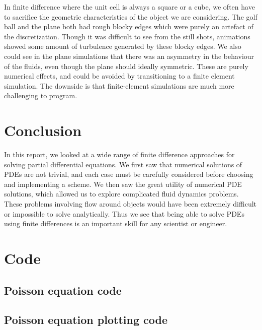 \documentclass[twocolumn]{myarticle}
\numberwithin{equation}{section}
\begin{document}
In finite difference where the unit cell is always a square or a cube, we often have to sacrifice the geometric characteristics of the object we are considering.
The golf ball and the plane both had rough blocky edges which were purely an artefact of the discretization.
Though it was difficult to see from the still shots, animations showed some amount of turbulence generated by these blocky edges.
We also could see in the plane simulations that there was an asymmetry in the behaviour of the fluids, even though the plane should ideally symmetric.
These are purely numerical effects, and could be avoided by transitioning to a finite element simulation.
The downside is that finite-element simulations are much more challenging to program.

\section{Conclusion}
\label{sec:conclusion}

In this report, we looked at a wide range of finite difference approaches for solving partial differential equations.
We first saw that numerical solutions of PDEs are not trivial, and each case must be carefully considered before choosing and implementing a scheme.
We then saw the great utility of numerical PDE solutions, which allowed us to explore complicated fluid dynamics problems.
These problems involving flow around objects would have been extremely difficult or impossible to solve analytically.
Thus we see that being able to solve PDEs using finite differences is an important skill for any scientist or engineer.

\onecolumn

\section{Code}
\label{sec:code}

\subsection{Poisson equation code}
\label{subsec:poisson_equation_code}


\vspace{10pt}

\subsection{Poisson equation plotting code}
\label{subsec:poisson_equation_plotting_code}
\end{document}
